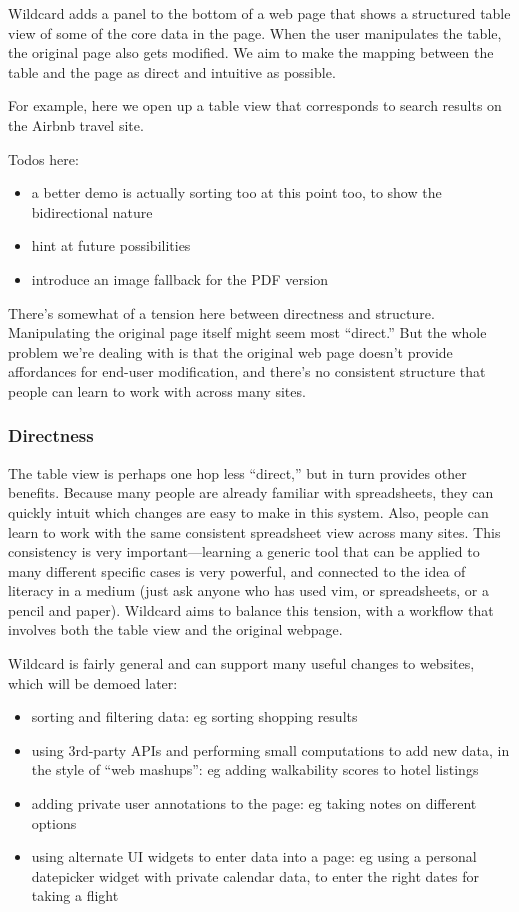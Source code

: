 \documentclass[english,submission]{programming}
\providecommand{\tightlist}{%
  \setlength{\itemsep}{0pt}\setlength{\parskip}{0pt}}
\begin{document}
Wildcard adds a panel to the bottom of a web page that shows a
structured table view of some of the core data in the page. When the
user manipulates the table, the original page also gets modified. We aim
to make the mapping between the table and the page as direct and
intuitive as possible.

For example, here we open up a table view that corresponds to search
results on the Airbnb travel site.

Todos here:

\begin{itemize}
\tightlist
\item
  a better demo is actually sorting too at this point too, to show the
  bidirectional nature
\item
  hint at future possibilities
\item
  introduce an image fallback for the PDF version
\end{itemize}

There's somewhat of a tension here between directness and structure.
Manipulating the original page itself might seem most ``direct.'' But
the whole problem we're dealing with is that the original web page
doesn't provide affordances for end-user modification, and there's no
consistent structure that people can learn to work with across many
sites.

\hypertarget{directness}{%
\subsubsection{Directness}\label{directness}}

The table view is perhaps one hop less ``direct,'' but in turn provides
other benefits. Because many people are already familiar with
spreadsheets, they can quickly intuit which changes are easy to make in
this system. Also, people can learn to work with the same consistent
spreadsheet view across many sites. This consistency is very
important---learning a generic tool that can be applied to many
different specific cases is very powerful, and connected to the idea of
literacy in a medium (just ask anyone who has used vim, or spreadsheets,
or a pencil and paper). Wildcard aims to balance this tension, with a
workflow that involves both the table view and the original webpage.

Wildcard is fairly general and can support many useful changes to
websites, which will be demoed later:

\begin{itemize}
\tightlist
\item
  sorting and filtering data: eg sorting shopping results
\item
  using 3rd-party APIs and performing small computations to add new
  data, in the style of ``web mashups'': eg adding walkability scores to
  hotel listings
\item
  adding private user annotations to the page: eg taking notes on
  different options
\item
  using alternate UI widgets to enter data into a page: eg using a
  personal datepicker widget with private calendar data, to enter the
  right dates for taking a flight
\end{itemize}
\end{document}
